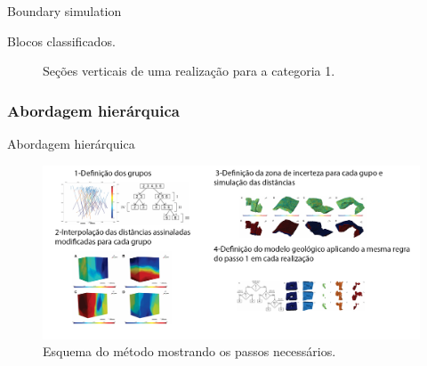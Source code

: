 \documentclass[aspectratio=169]{beamer}
\begin{document}
\begin{frame}{Boundary simulation}

Blocos classificados.

	\begin{figure}[H]
		\caption{Seções verticais de uma realização para a categoria 1.} 
		\label{cpar_real}
	\end{figure}
\end{frame}

\subsubsection{Abordagem hierárquica}

\begin{frame}{Abordagem hierárquica}
	\begin{figure}[H]
		\caption{\label{hier_ex}Esquema do método mostrando os passos necessários.}
		\begin{center}
			\includegraphics[width=\textwidth]{capitulo_2/hier_example.png}
		\end{center}
	\end{figure}
\end{frame}
\end{document}
